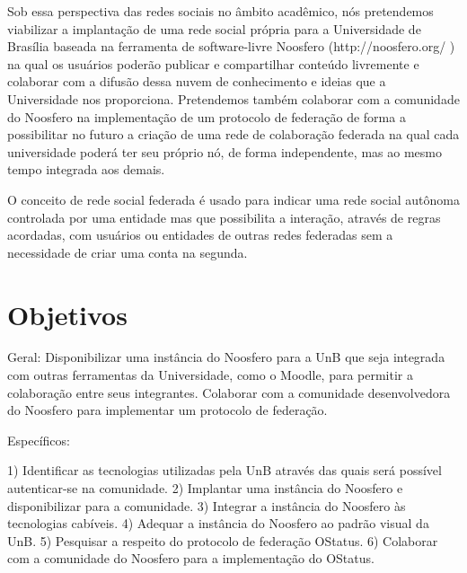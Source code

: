 Sob essa perspectiva das redes sociais no âmbito acadêmico, nós pretendemos viabilizar a implantação de uma rede social própria para a Universidade de Brasília baseada na ferramenta de software-livre Noosfero (http://noosfero.org/ ) na qual os usuários poderão publicar e compartilhar conteúdo livremente e colaborar com a difusão dessa nuvem de conhecimento e ideias que a Universidade nos proporciona. Pretendemos também colaborar com a comunidade do Noosfero na implementação de um protocolo de federação de forma a possibilitar no futuro a criação de uma rede de colaboração federada na qual cada universidade poderá ter seu próprio nó, de forma independente, mas ao mesmo tempo integrada aos demais.

O conceito de rede social federada é usado para indicar uma rede social autônoma controlada por uma entidade mas que possibilita a interação, através de regras acordadas, com usuários ou entidades de outras redes federadas sem a necessidade de criar uma conta na segunda.

\section{Objetivos}

Geral: Disponibilizar uma instância do Noosfero para a UnB que seja integrada com outras ferramentas da Universidade, como o Moodle, para permitir a colaboração entre seus integrantes. Colaborar com a comunidade desenvolvedora do Noosfero para implementar um protocolo de federação.

Específicos:
	
1) Identificar as tecnologias utilizadas pela UnB através das quais será possível autenticar-se na comunidade.
2) Implantar uma instância do Noosfero e disponibilizar para a comunidade.
3) Integrar a instância do Noosfero às tecnologias cabíveis.
4) Adequar a instância do Noosfero ao padrão visual da UnB.
5) Pesquisar a respeito do protocolo de federação OStatus.
6) Colaborar com a comunidade do Noosfero para a implementação do OStatus.


